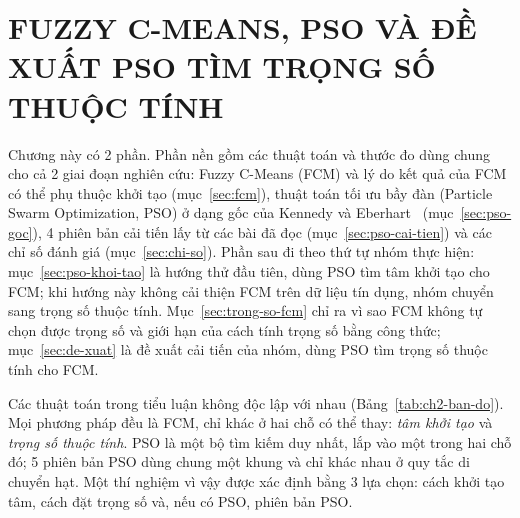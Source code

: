 \chapter{FUZZY C-MEANS, PSO VÀ ĐỀ XUẤT PSO TÌM TRỌNG SỐ THUỘC TÍNH}
\label{chap:phuong-phap}

Chương này có 2 phần. Phần nền gồm các thuật toán và thước đo dùng chung cho cả 2 giai đoạn nghiên cứu:
Fuzzy C-Means (FCM) và lý do kết quả của FCM có thể phụ thuộc khởi tạo (mục~\ref{sec:fcm}), thuật toán tối ưu bầy đàn
(Particle Swarm Optimization, PSO) ở dạng gốc của Kennedy và Eberhart~\cite{kennedy1995pso} (mục~\ref{sec:pso-goc}), 4
phiên bản cải tiến lấy từ các bài đã đọc (mục~\ref{sec:pso-cai-tien}) và các chỉ số đánh giá (mục~\ref{sec:chi-so}). Phần
sau đi theo thứ tự nhóm thực hiện: mục~\ref{sec:pso-khoi-tao} là hướng thử đầu tiên, dùng PSO tìm tâm khởi tạo cho FCM; khi
hướng này không cải thiện FCM trên dữ liệu tín dụng, nhóm chuyển sang trọng số thuộc tính. Mục~\ref{sec:trong-so-fcm} chỉ ra
vì sao FCM không tự chọn được trọng số và giới hạn của cách tính trọng số bằng công thức; mục~\ref{sec:de-xuat} là đề xuất cải
tiến của nhóm, dùng PSO tìm trọng số thuộc tính cho FCM.

Các thuật toán trong tiểu luận không độc lập với nhau (Bảng~\ref{tab:ch2-ban-do}). Mọi phương pháp đều là FCM, chỉ khác ở
hai chỗ có thể thay: \emph{tâm khởi tạo} và \emph{trọng số thuộc tính}. PSO là một bộ tìm kiếm duy nhất, lắp vào một trong hai
chỗ đó; 5 phiên bản PSO dùng chung một khung và chỉ khác nhau ở quy tắc di chuyển hạt. Một thí nghiệm vì vậy được xác định
bằng 3 lựa chọn: cách khởi tạo tâm, cách đặt trọng số và, nếu có PSO, phiên bản PSO.

